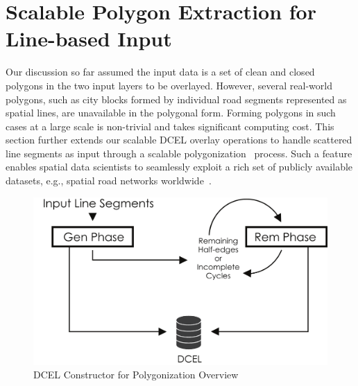 \section{Scalable Polygon Extraction for Line-based Input} \label{sec:polygonization}





Our discussion so far assumed the input data is a set of clean and closed polygons in the two input layers to be overlayed.
However, several real-world polygons, such as city blocks formed by individual road segments represented as spatial lines, are unavailable in the polygonal form.
Forming polygons in such cases at a large scale is non-trivial and takes significant computing cost.
This section further extends our scalable DCEL overlay operations to handle scattered line segments as input through a scalable polygonization~\cite{LailaMDMPaper} process.
Such a feature enables spatial data scientists to seamlessly exploit a rich set of publicly available datasets, e.g., spatial road networks worldwide~\cite{web:data:continents,web:data:usa}.



\begin{figure}[tb]
	\centering
	\includegraphics[width=0.75 \linewidth ]{model/overview_updated.png}
	\caption[caption]{DCEL Constructor for Polygonization Overview}
	\label{fig:overview_ddcel}
\end{figure}


